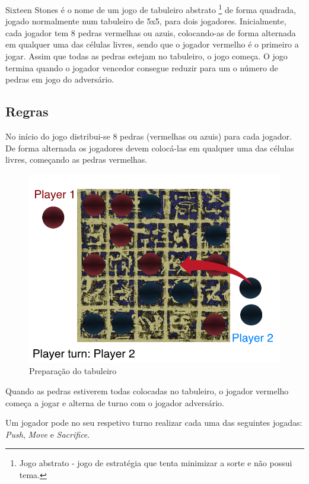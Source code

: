 \documentclass[a4paper]{article}
\begin{document}
Sixteen Stones é o nome de um jogo de tabuleiro abstrato \footnote{Jogo abstrato - jogo de estratégia que tenta minimizar a sorte e não possui tema.} de forma quadrada, jogado normalmente num tabuleiro de 5x5, para dois jogadores. Inicialmente, cada jogador tem 8 pedras vermelhas ou azuis, colocando-as de forma alternada em qualquer uma das células livres, sendo que o jogador vermelho é o primeiro a jogar. Assim que todas as pedras estejam no tabuleiro, o jogo começa. O jogo termina quando o jogador vencedor consegue reduzir para um o número de pedras em jogo do adversário.

\subsection{Regras}

No início do jogo distribui-se 8 pedras (vermelhas ou azuis) para cada jogador. De forma alternada os jogadores devem colocá-las em qualquer uma das células livres, começando as pedras vermelhas.

\begin{figure}[!htb]
\centering
\includegraphics[scale=0.3]{board_prep.png} 
\caption{Preparação do tabuleiro}
\end{figure}

Quando as pedras estiverem todas colocadas no tabuleiro, o jogador vermelho começa a jogar e alterna de turno com o jogador adversário.

Um jogador pode no seu respetivo turno realizar cada uma das seguintes jogadas: \textit{Push}, \textit{Move} e \textit{Sacrifice}.
\end{document}
